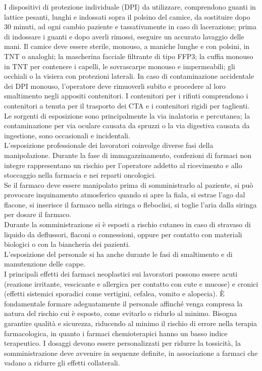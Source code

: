 I dispositivi di protezione individuale (DPI) da utilizzare, comprendono guanti in lattice pesanti, lunghi e indossati 
sopra il polsino del camice, da sostituire dopo 30 minuti, ad ogni cambio paziente e tassativamente in caso di 
lacerazione; prima di indossare i guanti e dopo averli rimossi, eseguire un accurato lavaggio delle mani. 
Il camice deve essere sterile, monouso, a maniche lunghe e con polsini, in TNT o analoghi; la mascherina facciale 
filtrante di tipo FFP3; la cuffia monouso in TNT per contenere i capelli, le sovrascarpe monouso e impermeabili; 
gli occhiali o la visiera con protezioni laterali. In caso di contaminazione accidentale dei DPI monouso,
l’operatore deve rimuoverli subito e procedere al loro smaltimento negli appositi contenitori\cite{FNOPI}. 
I contenitori per i rifiuti comprendono i contenitori a tenuta per il trasporto dei CTA e i 
contenitori rigidi per taglienti.\\

Le sorgenti di esposizione sono principalmente la via inalatoria e percutanea; la contaminazione per via oculare 
causata da spruzzi o la via digestiva causata da ingestione, sono occasionali e incidentali\cite{FNOPI}.\\ 
L'esposizione professionale dei lavoratori coinvolge diverse fasi della manipolazione. Durante la fase di 
immagazzinamento, confezioni di farmaci non integre rappresentano un rischio per l'operatore addetto al ricevimento e 
allo stoccaggio nella farmacia e nei reparti oncologici.\\ Se il farmaco deve essere manipolato prima di somministrarlo 
al paziente, si può provocare inquinamento atmosferico quando si apre la fiala, si estrae l'ago dal flacone, 
si inserisce il farmaco nella siringa o fleboclisi, si toglie l'aria dalla siringa per dosare il farmaco\cite{FNOPI}.\\ 
Durante la somministrazione si è esposti a rischio cutaneo in caso di stravaso di liquido da deflussori, flaconi o 
connessioni, oppure per contatto con materiali biologici o con la biancheria dei pazienti.\\ 
L'esposizione del personale si ha anche durante le fasi di smaltimento e di manutenzione delle cappe\cite{FNOPI}.\\
I principali effetti dei farmaci neoplastici sui lavoratori possono essere acuti (reazione irritante, vescicante e 
allergica per contatto con cute e mucose) e cronici (effetti sistemici sporadici come vertigini, cefalea, vomito e 
alopecia). È fondamentale formare adeguatamente il personale affinché venga compresa la natura del rischio cui è esposto, 
come evitarlo o ridurlo al minimo. Bisogna garantire qualità e sicurezza, riducendo al minimo il rischio di errore 
nella terapia farmacologica, in quanto i farmaci chemioterapici hanno un basso indice terapeutico. I dosaggi devono 
essere personalizzati per ridurre la tossicità, la somministrazione deve avvenire in sequenze definite, 
in associazione a farmaci che vadano a ridurre gli effetti collaterali\cite{ISSESPO}.

